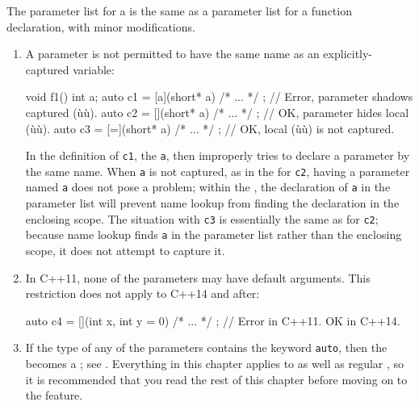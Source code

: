 \noindent The parameter list for a  is the same as a
parameter list for a function declaration, with minor modifications.

\begin{enumerate}
\item{A parameter is not permitted to have the same name as an explicitly-captured variable:

\begin{emcppslisting}
void f1()
{
    int a;
    auto c1 = [a](short* a){ /* ... */ };  // Error, parameter shadows captured (ù{}ù).
    auto c2 = [](short* a){ /* ... */ };   // OK, parameter hides local (ù{}ù).
    auto c3 = [=](short* a){ /* ... */ };  // OK, local (ù{}ù) is not captured.
}
\end{emcppslisting} 

\noindent In the definition of \lstinline!c1!, the 
 \lstinline!a!, then improperly tries to
declare a parameter by the same name. When \lstinline!a! is not captured,
as in the  for \lstinline!c2!, having a parameter
named \lstinline!a! does not pose a problem; within the , the declaration of \lstinline!a! in the parameter list will prevent
name lookup from finding the declaration in the enclosing scope. The
situation with \lstinline!c3! is essentially the same as for \lstinline!c2!;
because name lookup finds \lstinline!a! in the parameter list rather than
the enclosing scope, it does not attempt to capture it.}

\item{In C++11, none of the parameters may have default arguments. This restriction does not apply to C++14 and after:

\begin{emcppslisting}
auto c4 = [](int x, int y = 0){ /* ... */ };  // Error in C++11.  OK in C++14.
\end{emcppslisting}
}

\item{If the type of any of the parameters contains the keyword \lstinline!auto!, then the  becomes a ; see . Everything in this chapter applies to  as well as regular , so it is recommended that you read the rest of this chapter before moving on to the  feature.}
\end{enumerate}

